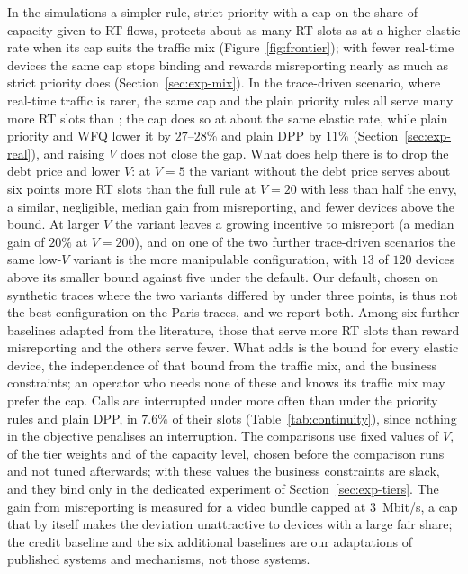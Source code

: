 In the simulations a simpler rule, strict priority with a cap on the share of capacity given to RT flows, protects about as many RT slots as \repay{} at a higher elastic rate when its cap suits the traffic mix (Figure~\ref{fig:frontier}); with fewer real-time devices the same cap stops binding and rewards misreporting nearly as much as strict priority does (Section~\ref{sec:exp-mix}). In the trace-driven scenario, where real-time traffic is rarer, the same cap and the plain priority rules all serve many more RT slots than \repay{}; the cap does so at about the same elastic rate, while plain priority and \textsc{WFQ} lower it by $27$--$28\%$ and plain DPP by $11\%$ (Section~\ref{sec:exp-real}), and raising $V$ does not close the gap. What does help there is to drop the debt price and lower $V$: at $V=5$ the variant without the debt price serves about six points more RT slots than the full rule at $V=20$ with less than half the envy, a similar, negligible, median gain from misreporting, and fewer devices above the bound. At larger $V$ the variant leaves a growing incentive to misreport (a median gain of $20\%$ at $V=200$), and on one of the two further trace-driven scenarios the same low-$V$ variant is the more manipulable configuration, with $13$ of $120$ devices above its smaller bound against five under the default. Our default, chosen on synthetic traces where the two variants differed by under three points, is thus not the best configuration on the Paris traces, and we report both. Among six further baselines adapted from the literature, those that serve more RT slots than \repay{} reward misreporting and the others serve fewer. What \repay{} adds is the bound for every elastic device, the independence of that bound from the traffic mix, and the business constraints; an operator who needs none of these and knows its traffic mix may prefer the cap.
Calls are interrupted under \repay{} more often than under the priority rules and plain DPP, in $7.6\%$ of their slots (Table~\ref{tab:continuity}), since nothing in the objective penalises an interruption.
The comparisons use fixed values of $V$, of the tier weights and of the capacity level, chosen before the comparison runs and not tuned afterwards; with these values the business constraints are slack, and they bind only in the dedicated experiment of Section~\ref{sec:exp-tiers}.
The gain from misreporting is measured for a video bundle capped at $3$~Mbit/s, a cap that by itself makes the deviation unattractive to devices with a large fair share; the credit baseline and the six additional baselines are our adaptations of published systems and mechanisms, not those systems.


